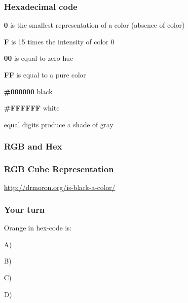 \documentclass[12pt]{beamer}\usepackage[]{graphicx}\usepackage[]{color}
\begin{document}

\begin{frame}
\frametitle{Hexadecimal code}

 \bi
  \item \textbf{0} is the smallest representation of a color (absence of color)
  \item \textbf{F} is 15 times the intensity of color 0
  \item \textbf{00} is equal to zero hue
  \item \textbf{FF} is equal to a pure color
  \item \textbf{\#000000} black
  \item \textbf{\#FFFFFF} white
  \item equal digits produce a shade of gray
 \ei
\eb

\end{frame}


\begin{frame}[fragile]
\frametitle{RGB and Hex}
\begin{center}
\end{center}
\end{frame}


\begin{frame}
\frametitle{RGB Cube Representation}
\begin{center}

{\scriptsize \url{http://drmoron.org/is-black-a-color/}}
\end{center}

\end{frame}


\begin{frame}
\frametitle{Your turn}

{\large Orange in hex-code is:}
\bbi
  \item[A)] 
  \item[B)] 
  \item[C)] 
  \item[D)] 
\ei

\end{frame}
\end{document}

